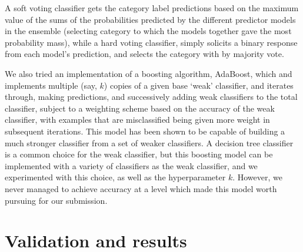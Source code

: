 \documentclass[letterpaper, 11pt]{article}
\begin{document}
A soft voting classifier gets the category label predictions based on the maximum value of the sums of the probabilities predicted by the different predictor models in the ensemble (selecting category to which the models together gave the most probability mass), while a hard voting classifier, simply solicits a binary response from each model's prediction, and selects the category with by majority vote.

We also tried an implementation of a boosting algorithm, AdaBoost, which and implements multiple (say, $k$) copies of a given base `weak' classifier, and iterates through, making predictions, and successively adding weak classifiers to the total classifier, subject to a weighting scheme based on the accuracy of the weak classifier, with examples that are misclassified being given more weight in subsequent iterations. This model has been shown to be capable of building a much stronger classifier from a set of weaker classifiers. A decision tree classifier is a common choice for the weak classifier, but this boosting model can be implemented with a variety of classifiers as the weak classifier, and we experimented with this choice, as well as the hyperparameter $k$. However, we never managed to achieve accuracy at a level which made this model worth pursuing for our submission.


\section{Validation and results}\label{sec:validation-results}
\end{document}
